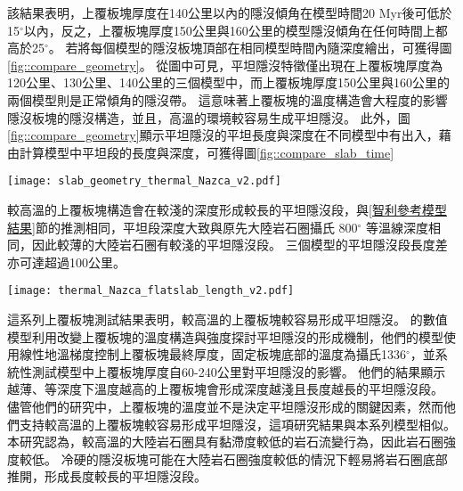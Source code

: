該結果表明，上覆板塊厚度在140公里以內的隱沒傾角在模型時間20 Myr後可低於15$^\circ$以內，反之，上覆板塊厚度150公里與160公里的模型隱沒傾角在任何時間上都高於25$^\circ$。
若將每個模型的隱沒板塊頂部在相同模型時間內隨深度繪出，可獲得圖\ref{fig::compare_geometry}。
從圖中可見，平坦隱沒特徵僅出現在上覆板塊厚度為120公里、130公里、140公里的三個模型中，而上覆板塊厚度150公里與160公里的兩個模型則是正常傾角的隱沒帶。
這意味著上覆板塊的溫度構造會大程度的影響隱沒板塊的隱沒構造，並且，高溫的環境較容易生成平坦隱沒。
此外，圖\ref{fig::compare_geometry}顯示平坦隱沒的平坦長度與深度在不同模型中有出入，藉由計算模型中平坦段的長度與深度，可獲得圖\ref{fig::compare_slab_time}

\begin{figure*}[ht!]
    \centering
    \texttt{[image: slab\_geometry\_thermal\_Nazca\_v2.pdf]}
    \caption[測試上覆板塊厚度模型在40 Myr的隱沒板塊構造]{測試上覆板塊厚度模型在40 Myr時隱沒板塊於150公里以上之構造，幾何形狀取自隱沒板塊頂部，使用5公里移動平均平滑離散化的網格，模型與圖\ref{fig::compare_dip_thermal}所使用的圖例相同。}
    \label{fig::compare_geometry}
\end{figure*}

較高溫的上覆板塊構造會在較淺的深度形成較長的平坦隱沒段，與\ref{智利參考模型結果}節的推測相同，平坦段深度大致與原先大陸岩石圈攝氏 800$^\circ$ 等溫線深度相同，因此較薄的大陸岩石圈有較淺的平坦隱沒段。
三個模型的平坦隱沒段長度差亦可達超過100公里。

\begin{figure*}[ht!]
    \centering
    \texttt{[image: thermal\_Nazca\_flatslab\_length\_v2.pdf]}
    \caption[測試上覆板塊厚度模型的平坦段長度與深度]{測試上覆板塊厚度模型的平坦段(a)長度與(b)深度。模型與圖\ref{fig::compare_dip_thermal}所使用的圖例相同。}
    \label{fig::compare_slab_time}
\end{figure*}

這系列上覆板塊測試結果表明，較高溫的上覆板塊較容易形成平坦隱沒。
\citet{liu2019influence}的數值模型利用改變上覆板塊的溫度構造與強度探討平坦隱沒的形成機制，他們的模型使用線性地溫梯度控制上覆板塊最終厚度，固定板塊底部的溫度為攝氏1336$^\circ$，並系統性測試模型中上覆板塊厚度自60-240公里對平坦隱沒的影響。
他們的結果顯示越薄、等深度下溫度越高的上覆板塊會形成深度越淺且長度越長的平坦隱沒段。
儘管他們的研究中，上覆板塊的溫度並不是決定平坦隱沒形成的關鍵因素，然而他們支持較高溫的上覆板塊較容易形成平坦隱沒，這項研究結果與本系列模型相似。
本研究認為，較高溫的大陸岩石圈具有黏滯度較低的岩石流變行為，因此岩石圈強度較低。
冷硬的隱沒板塊可能在大陸岩石圈強度較低的情況下輕易將岩石圈底部推開，形成長度較長的平坦隱沒段。

